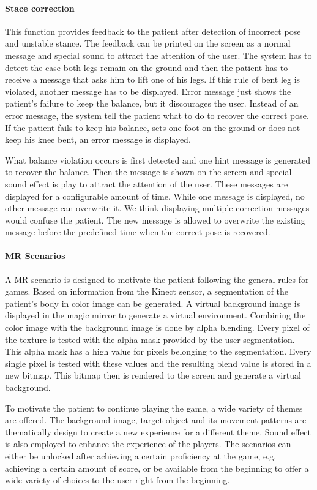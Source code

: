 \paragraph{Stace correction}
This function provides feedback to the patient after detection of incorrect pose and unstable stance. The feedback can be printed on the screen as a normal message and special sound to attract the attention of the user.
The system has to detect the case both legs remain on the ground and then the patient has to receive a message that asks him to lift one of his legs. 
If this rule of bent leg is violated, another message has to be displayed.
Error message just shows the patient's failure to keep the balance, but it discourages the user. Instead of an error message, the system tell the patient what to do to recover the correct pose. 
If the patient fails to keep his balance, sets one foot on the ground or does not keep his knee bent, an error message is displayed. 

What balance violation occurs is first detected and one hint message is generated to recover the balance. Then the message is shown on the screen and special sound effect is play to attract the attention of the user. These messages are displayed for a configurable amount of time. While one message is displayed, no other message can overwrite it. We think displaying multiple correction messages would confuse the patient. 
The new message is allowed to overwrite the existing message before the predefined time when the correct pose is recovered.

\paragraph{MR Scenarios}
A MR scenario is designed to motivate the patient following the general rules for games. 
Based on information from the Kinect sensor, a segmentation of the patient's body in color image can be generated. A virtual background image is displayed in the magic mirror to generate a virtual environment.  
Combining the color image with the background image is done by alpha blending. Every pixel of the texture is tested with the alpha mask provided by the user segmentation. This alpha mask has a high value for pixels belonging to the segmentation. Every single pixel is tested with these values and the resulting blend value is stored in a new bitmap. This bitmap then is rendered to the screen and generate a virtual background.

To motivate the patient to continue playing the game, a wide variety of themes are offered. The background image, target object and its movement patterns are thematically design to create a new experience for a different theme. Sound effect is also employed to enhance the experience of the players. 
The scenarios can either be unlocked after achieving a certain proficiency at the game, e.g. achieving a certain amount of score, or be available from the beginning to offer a wide variety of choices to the user right from the beginning. 

